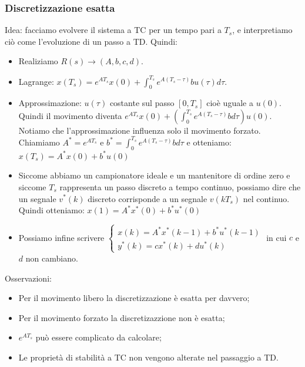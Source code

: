 \begin{landscape}
\begin{multicols*}{2}
    \subsubsection{Discretizzazione esatta}
    Idea: facciamo evolvere il sistema a TC per un tempo pari a $T_s$, e interpretiamo ciò come l'evoluzione di un passo a TD.\newline
    Quindi:
    \begin{itemize}
        \item Realiziamo $R(s) \rightarrow (A,b,c,d)$.
        \item Lagrange: $x(T_s) = e^{AT_s} x(0) + \int_{0}^{T_s} e^{A(T_s-\tau)} b u(\tau) d \tau$.
        \item Approssimazione: $u(\tau)$ costante sul passo $[0, T_s]$ cioè uguale a $u(0)$. Quindi il movimento diventa $e^{AT_s} x(0) + \left(\int_{0}^{T_s} e^{A(T_s-\tau)} b d \tau\right) u(0)$. Notiamo che l'approssimazione influenza solo il movimento forzato. Chiamiamo $A^* = e^{AT_s}$ e $b^* = \int_{0}^{T_s} e^{A(T_s-\tau)} b d \tau$ e otteniamo:\newline
        $x(T_s) = A^* x(0) + b^* u(0)$
        \item Siccome abbiamo un campionatore ideale e un mantenitore di ordine zero e siccome $T_s$ rappresenta un passo discreto a tempo continuo, possiamo dire che un segnale $v^*(k)$ discreto corrisponde a un segnale $v(kT_s)$ nel continuo. Quindi otteniamo:\newline
        $x(1) = A^* x^*(0) + b^* u^*(0)$
        \item Possiamo infine scrivere $\begin{cases}
            x(k) = A^* x^*(k-1) + b^* u^*(k-1)\\
            y^*(k) = c x^*(k) + d u^*(k)
        \end{cases}$ in cui $c$ e $d$ non cambiano.
    \end{itemize}
    Osservazioni:
    \begin{itemize}
        \item Per il movimento libero la discretizzazione è esatta per davvero;
        \item Per il movimento forzato la discretizazzione non è esatta;
        \item $e^{AT_s}$ può essere complicato da calcolare;
        \item Le proprietà di stabilità a TC non vengono alterate nel passaggio a TD.
    \end{itemize}

\end{multicols*}
\end{landscape}
